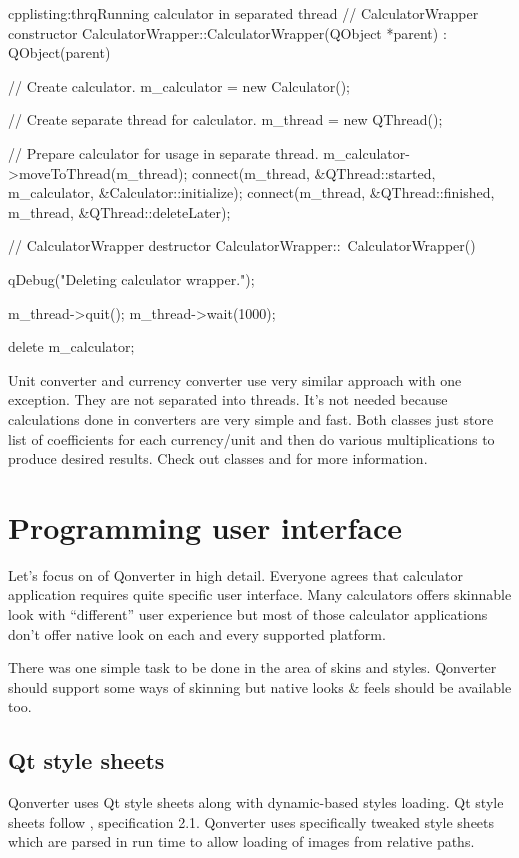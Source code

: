 \begin{fdoccode}{cpp}{listing:thrq}{Running calculator in separated thread}
// CalculatorWrapper constructor
CalculatorWrapper::CalculatorWrapper(QObject *parent) : QObject(parent) {
    // Create calculator.
    m_calculator = new Calculator();

    // Create separate thread for calculator.
    m_thread = new QThread();

    // Prepare calculator for usage in separate thread.
    m_calculator->moveToThread(m_thread);
    connect(m_thread, &QThread::started, m_calculator, &Calculator::initialize);
    connect(m_thread, &QThread::finished, m_thread, &QThread::deleteLater);
}

// CalculatorWrapper destructor
CalculatorWrapper::~CalculatorWrapper() {
    qDebug("Deleting calculator wrapper.");

    m_thread->quit();
    m_thread->wait(1000);

    delete m_calculator;
}
\end{fdoccode}

Unit converter and currency converter use very similar approach with one exception. They are not separated into threads. It's not needed because calculations done in converters are very simple and fast. Both classes just store list of coefficients for each currency/unit and then do various multiplications to produce desired results. Check out classes and for more information.

\section{Programming user interface}
Let's focus on  of Qonverter in high detail. Everyone agrees that calculator application requires quite specific user interface. Many calculators offers skinnable look with \enquote{different} user experience but most of those calculator applications don't offer native look on each and every supported platform.

There was one simple task to be done in the area of skins and styles. Qonverter should support some ways of skinning but native looks \& feels should be available too.

\subsection{Qt style sheets}
Qonverter uses Qt style sheets \citep[style sheets]{various:qtdoc} along with dynamic-based styles loading. Qt style sheets follow , specification 2.1. Qonverter uses specifically tweaked style sheets which are parsed in run time to allow loading of images from relative paths.

